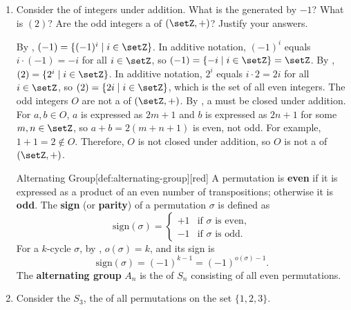 \begin{enumerate}
\begin{subprove}
    Therefore, \(n = o(a)\) divides \(m\), the order of \(G\).
  \end{subprove}
  \item Consider the  of integers under addition.
  What is the  generated by \(-1\)?
  What is \((2)\)?
  Are the odd integers a  of \((\setZ, +)\)?
  Justify your answers.
  \begin{subprove}
    By , \((-1) = \{(-1)^{i} \mid i \in \setZ\}\). 
    In additive notation, \((-1)^{i}\) equals \(i \cdot (-1) = -i\) for all \(i \in \setZ\), 
    so \((-1) = \{-i \mid i \in \setZ\} = \setZ\).\proofstep
    By , \((2) = \{2^{i} \mid i \in \setZ\}\). 
    In additive notation, \(2^{i}\) equals \(i \cdot 2 = 2i\) for all \(i \in \setZ\), 
    so \((2) = \{2i \mid i \in \setZ\}\), which is the set of all even integers.\proofstep
    The odd integers \(O\) are not a  of \((\setZ, +)\). 
    By , a  must be closed 
    under addition. For \(a, b \in O\), \(a\) is expressed as \(2m + 1\) and 
    \(b\) is expressed as \(2n + 1\) for some \(m, n \in \setZ\), so \(a + b = 2(m + n + 1)\) 
    is even, not odd. For example, \(1 + 1 = 2 \notin O\). \proofstep
    Therefore, \(O\) is not closed under addition, so \(O\) is not 
    a  of \((\setZ, +)\).
  \end{subprove}
  \newpage
  \begin{define}{Alternating Group}[def:alternating-group][red]
    A permutation is \textbf{even} if it is expressed as a product of an even number of transpositions; otherwise it is \textbf{odd}. 
    The \textbf{sign} (or \textbf{parity}) of a permutation \(\sigma\) is defined as
    \[
    \text{sign}(\sigma) = \begin{cases}
      +1 & \text{if } \sigma \text{ is even}, \\
      -1 & \text{if } \sigma \text{ is odd}.
    \end{cases}
    \]
    For a \(k\)-cycle \(\sigma\), by , \(o(\sigma) = k\), and its sign is
    \[
    \text{sign}(\sigma) = (-1)^{k-1} = (-1)^{o(\sigma)-1}.
    \]
    The \textbf{alternating group} \(A_{n}\) is the  of  \(S_{n}\) consisting of all even permutations.
  \end{define}
  \item Consider the  $S_3$, the  of all permutations on the set $\{1, 2, 3\}$.

\end{enumerate}

